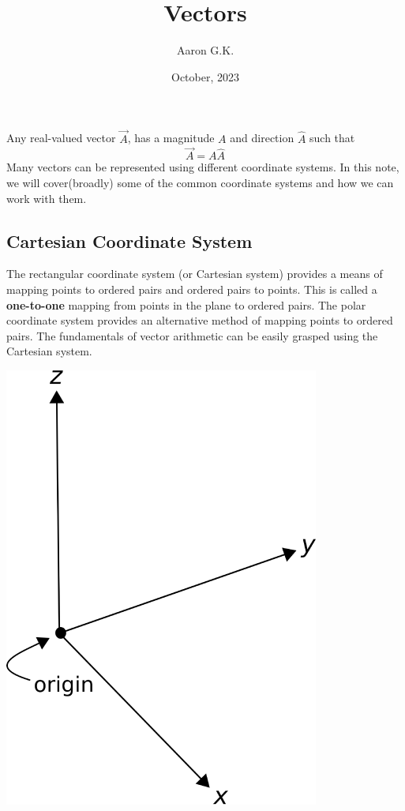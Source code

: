 \documentclass[12pt,addpoints]{exam}
\date{October, 2023}
\title{Vectors}
\author{Aaron G.K.}
\begin{document}
	\maketitle
	Any real-valued vector $\vec{A}$, has a magnitude $A$ and direction $\hat{A}$ such that
	$$\vec{A}=A\hat{A}$$
	Many vectors can be represented using different coordinate systems. In this note, we will cover(broadly) some of the common coordinate systems and how we can work with them.
	\subsection*{Cartesian Coordinate System}
	The rectangular coordinate system (or Cartesian system) provides a means of mapping points to ordered pairs and ordered pairs to points. This is called a \textbf{one-to-one} mapping from points in the plane to ordered pairs. The polar coordinate system provides an alternative method of mapping points to ordered pairs. The fundamentals of vector arithmetic can be easily grasped using the Cartesian system.
	\begin{center}
		\includegraphics[scale=1.0]{cartesian.png}
	\end{center}
\end{document}
